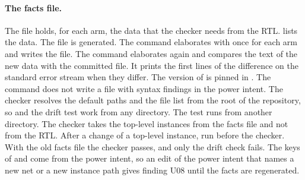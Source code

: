 \paragraph{The facts file.} The file  holds, for each arm, the data that the checker needs from the RTL.  lists the data. The file is generated. The command  elaborates  with  once for each arm and writes the file. The command  elaborates again and compares the text of the new data with the committed file. It prints the first lines of the difference on the standard error stream when they differ. The version of  is pinned in . The command does not write a file with syntax findings in the power intent. The checker resolves the default paths and the file list  from the root of the repository, so  and the drift test work from any directory. The test  runs  from another directory. The checker takes the top-level instances from the facts file and not from the RTL. After a change of a top-level instance, run  before the checker. With the old facts file the checker passes, and only the drift check fails. The keys of  and  come from the power intent, so an edit of the power intent that names a new net or a new instance path gives finding U08 until the facts are regenerated.

